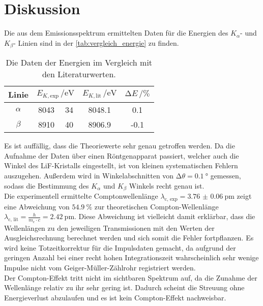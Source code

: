 \section{Diskussion}
\label{sec:Diskussion}

Die aus dem Emissionsspektrum ermittelten Daten für die Energien des $K_{\alpha}$- und $K_{\beta}$- Linien sind in der \autoref{tab:vergleich_energie} zu finden. 

\begin{table}[H]
    \centering
    \caption{Die Daten der Energien im Vergleich mit den Literaturwerten.}
    \label{tab:vergleich_energie}
    \begin{tabular}{c c @{${} \pm {}$} c c c}
        \toprule
        Linie & \multicolumn{2}{c}{$E_{K, \text{exp}} \, / \si{\electronvolt}$ } & $E_{K, \text{lit}} \, / \si{\electronvolt} $ \cite{theoE} & $\increment E  \, / \si{\percent}$ \\
        \midrule
        $\alpha$ &  8043 & 34 & 8048.1 & 0.1 \\
        $\beta $  &  8910 & 40 & 8906.9 & -0.1 \\
        \bottomrule
    \end{tabular}
\end{table}

\noindent Es ist auffällig, dass die Theoriewerte sehr genau getroffen werden. Da die Aufnahme der Daten über einen Röntgenapparat passiert, welcher auch die 
Winkel des LiF-Kristalls eingestellt, ist von kleinen systematischen Fehlern auszugehen. Außerdem wird in Winkelabschnitten von $\increment \theta = \SI{0.1}{\degree}$ 
gemessen, sodass die Bestimmung des $K_{\alpha}$ und $K_{\beta}$ Winkels recht genau ist. \\


\noindent Die experimentell ermittelte Comptonwellenlänge $\lambda_{\text{c, exp}} = \SI{3.76(6)}{\pico\metre}$ zeigt eine Abweichung von $ \SI{54.9}{\percent}$
zur theoretischen Compton-Wellenlänge $\lambda_{\text{c, lit}} = \frac{h}{m_e \cdot c} = \SI{2.42}{\pico\metre}$. Diese Abweichung ist vielleicht damit erklärbar, 
dass die Wellenlängen zu den jeweiligen Transmissionen mit den Werten der Ausgleichsrechnung berechnet werden und sich somit die Fehler fortpflanzen. 
Es wird keine Totzeitkorrektur für die Impulsdaten gemacht, da aufgrund der geringen Anzahl bei einer recht hohen Integrationszeit wahrscheinlich sehr wenige
Impulse nicht vom Geiger-Müller-Zählrohr registriert werden. \\
Der Compton-Effekt tritt nicht im sichtbaren Spektrum auf, da die Zunahme der Wellenlänge relativ zu ihr sehr gering ist. Dadurch scheint die Streuung ohne
Energieverlust abzulaufen und es ist kein Compton-Effekt nachweisbar. 